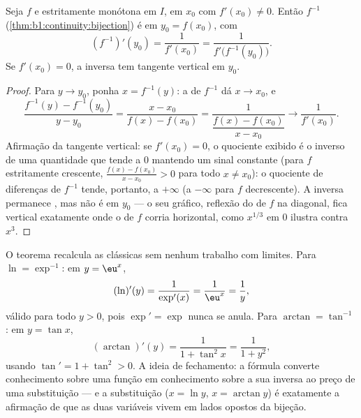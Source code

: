 \begin{theorem}\label{thm:b1:derivative:inverse}
Seja $f$  e estritamente monótona em $I$, 
em $x_0$ com $f'(x_0) \neq 0$. Então $f^{-1}$
(\cref{thm:b1:continuity:bijection}) é  em $y_0 =
f(x_0)$, com
\[
(f^{-1})'(y_0) = \frac{1}{f'(x_0)} = \frac{1}{f'\bigl(f^{-1}(y_0)\bigr)} .
\]
Se $f'(x_0) = 0$, a inversa tem tangente vertical em $y_0$.
\end{theorem}

\begin{proof}
Para $y \to y_0$, ponha $x = f^{-1}(y)$: a  de $f^{-1}$ dá $x
\to x_0$, e
\[
\frac{f^{-1}(y) - f^{-1}(y_0)}{y - y_0}
= \frac{x - x_0}{f(x) - f(x_0)}
= \frac{1}{\dfrac{f(x) - f(x_0)}{x - x_0}}
\longrightarrow \frac{1}{f'(x_0)} .
\]
Afirmação da tangente vertical: se $f'(x_0) = 0$, o quociente exibido
é o inverso de uma quantidade que tende a $0$ mantendo
um sinal constante (para $f$ estritamente crescente, $\frac{f(x) -
f(x_0)}{x - x_0} > 0$ para todo $x \neq x_0$): o quociente
de diferenças de $f^{-1}$ tende, portanto, a $+\infty$ (a $-\infty$
para $f$ decrescente). A inversa permanece , mas não é
 em $y_0$ --- o seu gráfico, reflexão do de $f$
na diagonal, fica vertical exatamente onde o de $f$ corria
horizontal, como $x^{1/3}$ em $0$ ilustra contra $x^3$.
\end{proof}

\begin{example}\label{ex:b1:derivative:inverseaction}
O teorema recalcula as  clássicas sem nenhum trabalho
com limites. Para $\ln = \exp^{-1}$: em $y = \eu^x$,
\[
(\ln)'(y) = \frac{1}{\exp'(x)} = \frac{1}{\eu^{x}} = \frac1y ,
\]
válido para todo $y > 0$, pois $\exp' = \exp$ nunca se anula. Para
$\arctan = \tan^{-1}$: em $y = \tan x$,
\[
(\arctan)'(y) = \frac{1}{1 + \tan^2 x} = \frac{1}{1 + y^2} ,
\]
usando $\tan' = 1 + \tan^2 > 0$. A ideia de fechamento: a fórmula
converte conhecimento sobre uma função em conhecimento sobre a sua
inversa ao preço de uma substituição --- e a
substituição ($x = \ln y$, $x = \arctan y$) é exatamente a
afirmação de que as duas variáveis vivem em lados opostos da
bijeção.
\end{example}

